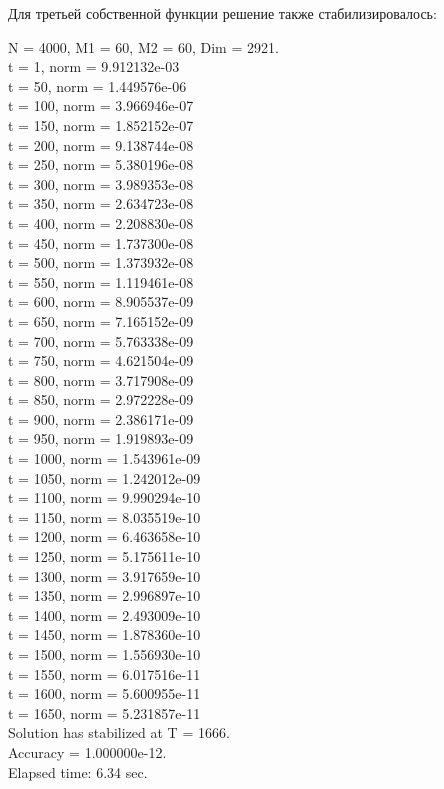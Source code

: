 \documentclass[12pt,a4paper]{article}
\begin{document}
Для третьей собственной функции решение также стабилизировалось:
\begin{center}
N = 4000, M1 =  60, M2 =  60, Dim =   2921. \\
t =   1, norm = 9.912132e-03 \\
t =  50, norm = 1.449576e-06 \\
t = 100, norm = 3.966946e-07 \\
t = 150, norm = 1.852152e-07 \\
t = 200, norm = 9.138744e-08 \\
t = 250, norm = 5.380196e-08 \\
t = 300, norm = 3.989353e-08 \\
t = 350, norm = 2.634723e-08 \\
t = 400, norm = 2.208830e-08 \\
t = 450, norm = 1.737300e-08 \\
t = 500, norm = 1.373932e-08 \\
t = 550, norm = 1.119461e-08 \\
t = 600, norm = 8.905537e-09 \\
t = 650, norm = 7.165152e-09 \\
t = 700, norm = 5.763338e-09 \\
t = 750, norm = 4.621504e-09 \\
t = 800, norm = 3.717908e-09 \\
t = 850, norm = 2.972228e-09 \\
t = 900, norm = 2.386171e-09 \\
t = 950, norm = 1.919893e-09 \\
t = 1000, norm = 1.543961e-09 \\
t = 1050, norm = 1.242012e-09 \\
t = 1100, norm = 9.990294e-10 \\
t = 1150, norm = 8.035519e-10 \\
t = 1200, norm = 6.463658e-10 \\
t = 1250, norm = 5.175611e-10 \\
t = 1300, norm = 3.917659e-10 \\
t = 1350, norm = 2.996897e-10 \\
t = 1400, norm = 2.493009e-10 \\
t = 1450, norm = 1.878360e-10 \\
t = 1500, norm = 1.556930e-10 \\
t = 1550, norm = 6.017516e-11 \\
t = 1600, norm = 5.600955e-11 \\
t = 1650, norm = 5.231857e-11 \\
Solution has stabilized at T = 1666. \\
Accuracy = 1.000000e-12. \\
Elapsed time: 6.34 sec.
\end{center}
\end{document}
